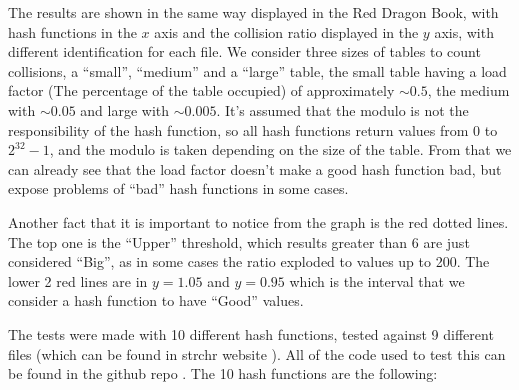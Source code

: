 The results are shown in the same way displayed in the Red Dragon Book, with hash functions in the \( x \) axis and the collision ratio displayed in the \( y \) axis, with different identification for each file. We consider three sizes of tables to count collisions, a ``small'', ``medium'' and a ``large'' table, the small table having a load factor (The percentage of the table occupied) of approximately \( \sim 0.5 \), the medium with \( \sim 0.05 \) and large with \( \sim 0.005 \). It's assumed that the modulo is not the responsibility of the hash function, so all hash functions return values from 0 to \( 2^{32} - 1 \), and the modulo is taken depending on the size of the table. From that we can already see that the load factor doesn't make a good hash function bad, but expose problems of ``bad'' hash functions in some cases. 

Another fact that it is important to notice from the graph is the red dotted lines. The top one is the ``Upper'' threshold, which results greater than 6 are just considered ``Big'', as in some cases the ratio exploded to values up to 200. The lower 2 red lines are in \( y = 1.05 \) and \( y = 0.95 \) which is the interval that we consider a hash function to have ``Good'' values. 

The tests were made with 10 different hash functions, tested against 9 different files (which can be found in strchr website \citep{DragonHashFunc}). All of the code used to test this can be found in the github repo \citep{GithubRepo}. The 10 hash functions are the following:


